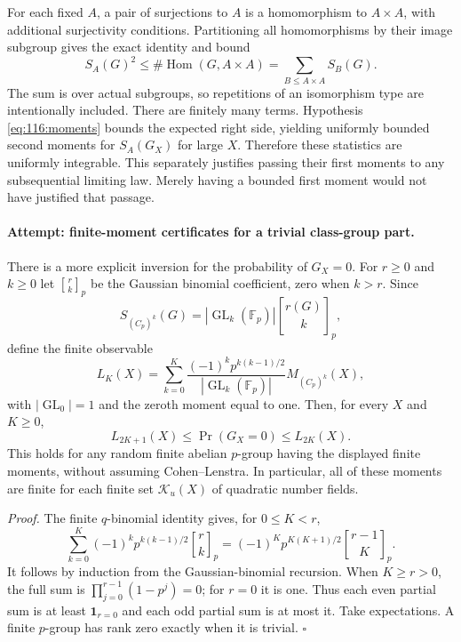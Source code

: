 \documentclass[11pt,a4paper]{article}
\newcommand{\F}{\mathbb{F}}
\numberwithin{equation}{section}
\begin{document}
For each fixed $A$, a pair of surjections to $A$ is a homomorphism to
$A\times A$, with additional surjectivity conditions. Partitioning all
homomorphisms by their image subgroup gives the exact identity and bound
\begin{equation}\label{eq:116:UI}
 S_A(G)^2\leq\#\operatorname{Hom}(G,A\times A)
 =\sum_{B\leq A\times A}S_B(G).
\end{equation}
The sum is over actual subgroups, so repetitions of an isomorphism type
are intentionally included. There are finitely many terms. Hypothesis
\eqref{eq:116:moments} bounds the expected right side, yielding uniformly
bounded second moments for $S_A(G_X)$ for large $X$. Therefore these
statistics are uniformly integrable. This separately justifies passing
their first moments to any subsequential limiting law. Merely having a
bounded first moment would not have justified that passage.

\paragraph{Attempt: finite-moment certificates for a trivial class-group part.}
There is a more explicit inversion for the probability of $G_X=0$.
For $r\geq0$ and $k\geq0$ let $\genfrac{[}{]}{0pt}{}{r}{k}_p$ be the Gaussian binomial
coefficient, zero when $k>r$. Since
\[
 S_{(C_p)^k}(G)=|\operatorname{GL}_k(\F_p)|\genfrac{[}{]}{0pt}{}{r(G)}{k}_p,
\]
define the finite observable
\[
 L_K(X)=\sum_{k=0}^K
 \frac{(-1)^k p^{k(k-1)/2}}{|\operatorname{GL}_k(\F_p)|}
 M_{(C_p)^k}(X),
\]
with $|\operatorname{GL}_0|=1$ and the zeroth moment equal to one.
Then, for every $X$ and $K\geq0$,
\begin{equation}\label{eq:116:bonferroni}
 L_{2K+1}(X)\leq\Pr(G_X=0)\leq L_{2K}(X).
\end{equation}
This holds for any random finite abelian $p$-group having the displayed
finite moments, without assuming Cohen--Lenstra. In particular, all of
these moments are finite for each finite set $\mathcal K_u(X)$ of quadratic number fields.

\emph{Proof.} The finite $q$-binomial identity gives, for $0\leq K<r$,
\[
 \sum_{k=0}^K(-1)^kp^{k(k-1)/2}\genfrac{[}{]}{0pt}{}{r}{k}_p
 =(-1)^Kp^{K(K+1)/2}\genfrac{[}{]}{0pt}{}{r-1}{K}_p.
\]
It follows by induction from the Gaussian-binomial recursion. When
$K\geq r>0$, the full sum is
$\prod_{j=0}^{r-1}(1-p^j)=0$; for $r=0$ it is one.
Thus each even partial sum is at least $\mathbf1_{r=0}$ and each odd
partial sum is at most it. Take expectations. A finite $p$-group has
rank zero exactly when it is trivial. $\square$
\end{document}

